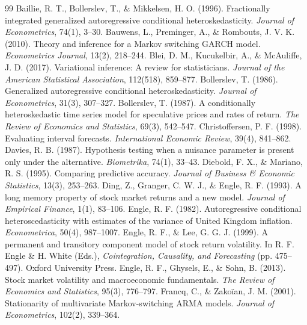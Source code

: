 \documentclass[12pt,a4paper]{article}
\numberwithin{equation}{section}
\theoremstyle{definition}
\begin{document}
	\newpage
	
	\begin{thebibliography}{99}
		 Baillie, R. T., Bollerslev, T., \& Mikkelsen, H. O. (1996). Fractionally integrated generalized autoregressive conditional heteroskedasticity. \emph{Journal of Econometrics}, 74(1), 3--30.
		 Bauwens, L., Preminger, A., \& Rombouts, J. V. K. (2010). Theory and inference for a Markov switching GARCH model. \emph{Econometrics Journal}, 13(2), 218--244.
		 Blei, D. M., Kucukelbir, A., \& McAuliffe, J. D. (2017). Variational inference: A review for statisticians. \emph{Journal of the American Statistical Association}, 112(518), 859--877.
		 Bollerslev, T. (1986). Generalized autoregressive conditional heteroskedasticity. \emph{Journal of Econometrics}, 31(3), 307--327.
		 Bollerslev, T. (1987). A conditionally heteroskedastic time series model for speculative prices and rates of return. \emph{The Review of Economics and Statistics}, 69(3), 542--547.
		 Christoffersen, P. F. (1998). Evaluating interval forecasts. \emph{International Economic Review}, 39(4), 841--862.
		 Davies, R. B. (1987). Hypothesis testing when a nuisance parameter is present only under the alternative. \emph{Biometrika}, 74(1), 33--43.
		 Diebold, F. X., \& Mariano, R. S. (1995). Comparing predictive accuracy. \emph{Journal of Business \& Economic Statistics}, 13(3), 253--263.
		 Ding, Z., Granger, C. W. J., \& Engle, R. F. (1993). A long memory property of stock market returns and a new model. \emph{Journal of Empirical Finance}, 1(1), 83--106.
		 Engle, R. F. (1982). Autoregressive conditional heteroscedasticity with estimates of the variance of United Kingdom inflation. \emph{Econometrica}, 50(4), 987--1007.
		 Engle, R. F., \& Lee, G. G. J. (1999). A permanent and transitory component model of stock return volatility. In R. F. Engle \& H. White (Eds.), \emph{Cointegration, Causality, and Forecasting} (pp. 475--497). Oxford University Press.
		 Engle, R. F., Ghysels, E., \& Sohn, B. (2013). Stock market volatility and macroeconomic fundamentals. \emph{The Review of Economics and Statistics}, 95(3), 776--797.
		 Francq, C., \& Zakoïan, J. M. (2001). Stationarity of multivariate Markov-switching ARMA models. \emph{Journal of Econometrics}, 102(2), 339--364.

\end{thebibliography}
\end{document}
